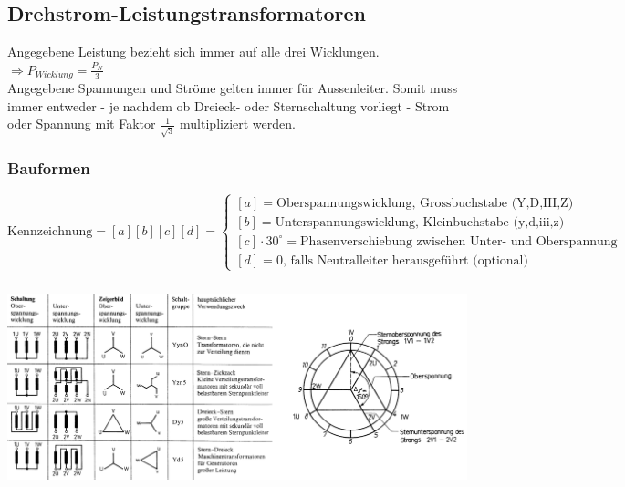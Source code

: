	\subsection{Drehstrom-Leistungstransformatoren} 
	Angegebene Leistung bezieht sich immer auf alle drei Wicklungen. $\Rightarrow P_{Wicklung} =
	\frac{P_N}{3}$ \\
	Angegebene Spannungen und Str\"ome gelten immer für Aussenleiter. Somit muss immer entweder - je
 nachdem ob Dreieck- oder Sternschaltung vorliegt -	Strom oder Spannung mit Faktor
 $\frac{1}{\sqrt{3}}$ multipliziert werden.
 	\subsubsection{Bauformen}
	 $$\text{Kennzeichnung} = [a][b][c][d] = \begin{cases}
                  [a] = \text{Oberspannungswicklung, Grossbuchstabe (Y,D,III,Z)
                  }\\
                  [b] = \text{Unterspannungswicklung, Kleinbuchstabe (y,d,iii,z) } \\
                  [c] \cdot 30^\circ = \text{Phasenverschiebung zwischen Unter- und Oberspannung }
                  \\ [d] = 0 \text{, falls Neutralleiter herausgeführt (optional)}
                  \end{cases}$$
		\begin{center}
	    	\includegraphics[height=6cm]{bilder/Drehstromtrafo.png}
	    \end{center} 
	    

	    
